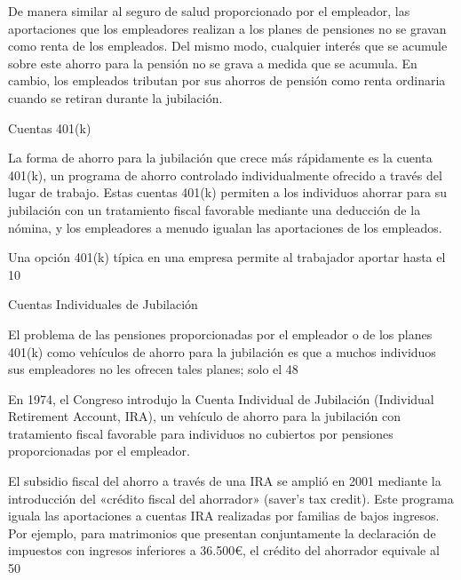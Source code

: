 \documentclass[10pt,a4paper]{article}
\begin{document}
De manera similar al seguro de salud proporcionado por el empleador, las aportaciones que los empleadores realizan a los planes de pensiones no se gravan como renta de los empleados. Del mismo modo, cualquier interés que se acumule sobre este ahorro para la pensión no se grava a medida que se acumula. En cambio, los empleados tributan por sus ahorros de pensión como renta ordinaria cuando se retiran durante la jubilación.

Cuentas 401(k)

La forma de ahorro para la jubilación que crece más rápidamente es la cuenta 401(k), un programa de ahorro controlado individualmente ofrecido a través del lugar de trabajo. Estas cuentas 401(k) permiten a los individuos ahorrar para su jubilación con un tratamiento fiscal favorable mediante una deducción de la nómina, y los empleadores a menudo igualan las aportaciones de los empleados.

Una opción 401(k) típica en una empresa permite al trabajador aportar hasta el 10 %

Cuentas Individuales de Jubilación

El problema de las pensiones proporcionadas por el empleador o de los planes 401(k) como vehículos de ahorro para la jubilación es que a muchos individuos sus empleadores no les ofrecen tales planes; solo el 48 %

En 1974, el Congreso introdujo la Cuenta Individual de Jubilación (Individual Retirement Account, IRA), un vehículo de ahorro para la jubilación con tratamiento fiscal favorable para individuos no cubiertos por pensiones proporcionadas por el empleador. 

El subsidio fiscal del ahorro a través de una IRA se amplió en 2001 mediante la introducción del «crédito fiscal del ahorrador» (saver’s tax credit). Este programa iguala las aportaciones a cuentas IRA realizadas por familias de bajos ingresos. Por ejemplo, para matrimonios que presentan conjuntamente la declaración de impuestos con ingresos inferiores a 36.500€, el crédito del ahorrador equivale al 50 %
\end{document}
